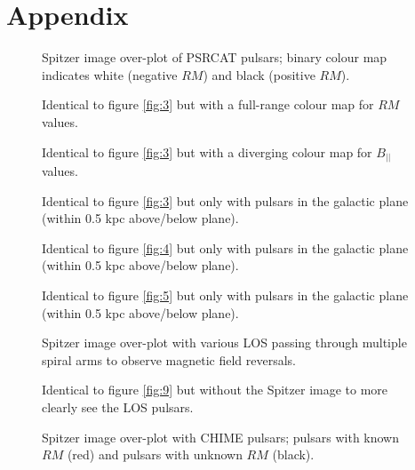 \documentclass[12pt]{article}
\begin{document}
\section{Appendix}
    \begin{figure}[!htb]
        \caption{\label{fig:3} Spitzer image over-plot of PSRCAT pulsars; binary colour map indicates white (negative $RM$) and black (positive $RM$).}
    \end{figure}
    \begin{figure}[!htb]
        \caption{\label{fig:4} Identical to figure \eqref{fig:3} but with a full-range colour map for $RM$ values.}
    \end{figure}
    \begin{figure}[!htb]
        \caption{\label{fig:5} Identical to figure \eqref{fig:3} but with a diverging colour map for $B_{||}$ values.}
    \end{figure}
    \begin{figure}[!htb]
        \caption{\label{fig:6} Identical to figure \eqref{fig:3} but only with pulsars in the galactic plane (within 0.5 kpc above/below plane).}
    \end{figure}
    \begin{figure}[!htb]
        \caption{\label{fig:7} Identical to figure \eqref{fig:4} but only with pulsars in the galactic plane (within 0.5 kpc above/below plane).}
    \end{figure}
    \begin{figure}[!htb]
        \caption{\label{fig:8} Identical to figure \eqref{fig:5} but only with pulsars in the galactic plane (within 0.5 kpc above/below plane).}
    \end{figure}
    \begin{figure}[!htb]
        \caption{\label{fig:9} Spitzer image over-plot with various LOS passing through multiple spiral arms to observe magnetic field reversals.}
    \end{figure}
    \begin{figure}[!htb]
        \caption{\label{fig:10} Identical to figure \eqref{fig:9} but without the Spitzer image to more clearly see the LOS pulsars.}
    \end{figure}
    \begin{figure}[!htb]
        \caption{\label{fig:11} Spitzer image over-plot with CHIME pulsars; pulsars with known $RM$ (red) and pulsars with unknown $RM$ (black).}
    \end{figure}
    
\end{document}
